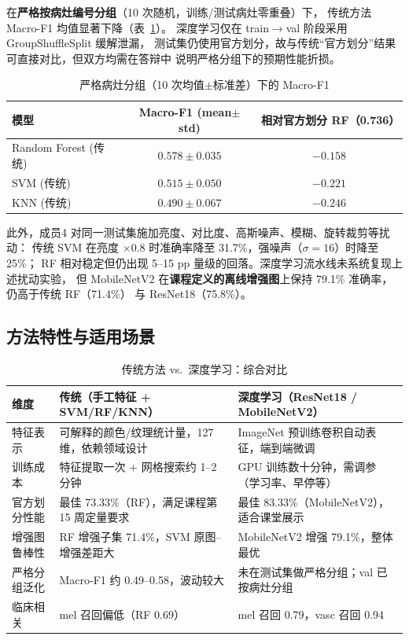 \documentclass[12pt,a4paper]{ctexart}
\begin{document}
在\textbf{严格按病灶编号分组}（10 次随机，训练/测试病灶零重叠）下，
传统方法 Macro-F1 均值显著下降（表~\ref{tab:strict_group}）。
深度学习仅在 train$\rightarrow$val 阶段采用 GroupShuffleSplit 缓解泄漏，
测试集仍使用官方划分，故与传统“官方划分”结果可直接对比，但双方均需在答辩中
说明严格分组下的预期性能折损。

\begin{table}[H]
  \centering
  \caption{严格病灶分组（10 次均值$\pm$标准差）下的 Macro-F1}
  \label{tab:strict_group}
  \begin{tabular}{lcc}
    \toprule
    模型 & Macro-F1 (mean$\pm$std) & 相对官方划分 RF（0.736） \\
    \midrule
    Random Forest (传统) & $0.578 \pm 0.035$ & $-0.158$ \\
    SVM (传统)           & $0.515 \pm 0.050$ & $-0.221$ \\
    KNN (传统)           & $0.490 \pm 0.067$ & $-0.246$ \\
    \bottomrule
  \end{tabular}
\end{table}

此外，成员4 对同一测试集施加亮度、对比度、高斯噪声、模糊、旋转裁剪等扰动：
传统 SVM 在亮度 $\times 0.8$ 时准确率降至 31.7\%，强噪声（$\sigma{=}16$）时降至 25\%；
RF 相对稳定但仍出现 5--15 pp 量级的回落。深度学习流水线未系统复现上述扰动实验，
但 MobileNetV2 在\textbf{课程定义的离线增强图}上保持 79.1\% 准确率，仍高于传统 RF（71.4\%）
与 ResNet18（75.8\%）。

\subsection{方法特性与适用场景}

\begin{table}[H]
  \centering
  \caption{传统方法 vs.\ 深度学习：综合对比}
  \label{tab:trad_vs_dl_summary}
  \small
  \begin{tabular}{p{2.2cm}p{5.2cm}p{5.2cm}}
    \toprule
    维度 & 传统（手工特征 + SVM/RF/KNN） & 深度学习（ResNet18 / MobileNetV2） \\
    \midrule
    特征表示 &
    可解释的颜色/纹理统计量，127 维，依赖领域设计 &
    ImageNet 预训练卷积自动表征，端到端微调 \\
    训练成本 &
    特征提取一次 + 网格搜索约 1--2 分钟 &
    GPU 训练数十分钟，需调参（学习率、早停等） \\
    官方划分性能 &
    最佳 73.33\%（RF），满足课程第 15 周定量要求 &
    最佳 83.33\%（MobileNetV2），适合课堂展示 \\
    增强图鲁棒性 &
    RF 增强子集 71.4\%，SVM 原图--增强差距大 &
    MobileNetV2 增强 79.1\%，整体最优 \\
    严格分组泛化 &
    Macro-F1 约 0.49--0.58，波动较大 &
    未在测试集做严格分组；val 已按病灶分组 \\
    临床相关 &
    mel 召回偏低（RF 0.69） &
    mel 召回 0.79，vasc 召回 0.94 \\
    \bottomrule
  \end{tabular}
\end{table}
\end{document}
